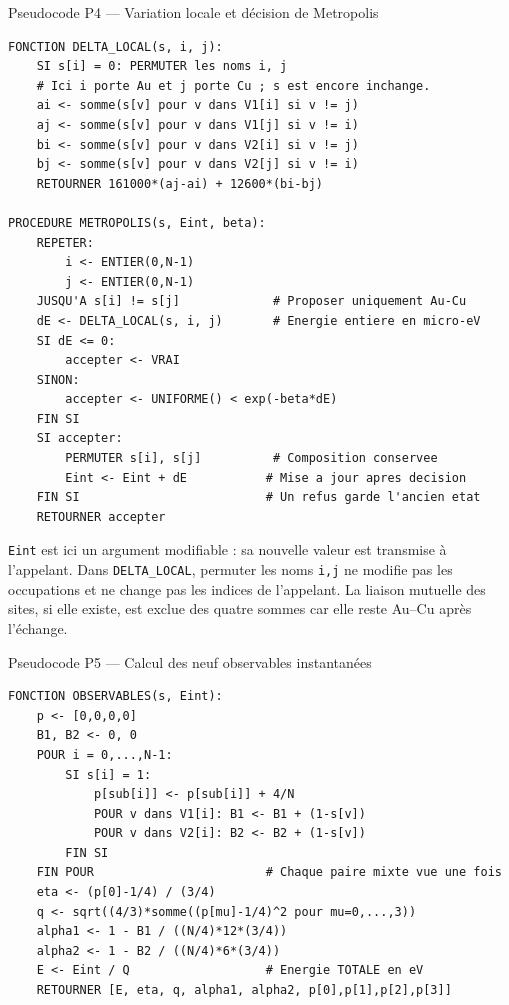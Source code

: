 \documentclass[10pt,a4paper]{article}
\begin{document}
\begin{algocode}{Pseudocode P4 --- Variation locale et décision de Metropolis}
\small
\begin{verbatim}
FONCTION DELTA_LOCAL(s, i, j):
    SI s[i] = 0: PERMUTER les noms i, j
    # Ici i porte Au et j porte Cu ; s est encore inchange.
    ai <- somme(s[v] pour v dans V1[i] si v != j)
    aj <- somme(s[v] pour v dans V1[j] si v != i)
    bi <- somme(s[v] pour v dans V2[i] si v != j)
    bj <- somme(s[v] pour v dans V2[j] si v != i)
    RETOURNER 161000*(aj-ai) + 12600*(bi-bj)

PROCEDURE METROPOLIS(s, Eint, beta):
    REPETER:
        i <- ENTIER(0,N-1)
        j <- ENTIER(0,N-1)
    JUSQU'A s[i] != s[j]             # Proposer uniquement Au-Cu
    dE <- DELTA_LOCAL(s, i, j)       # Energie entiere en micro-eV
    SI dE <= 0:
        accepter <- VRAI
    SINON:
        accepter <- UNIFORME() < exp(-beta*dE)
    FIN SI
    SI accepter:
        PERMUTER s[i], s[j]          # Composition conservee
        Eint <- Eint + dE           # Mise a jour apres decision
    FIN SI                          # Un refus garde l'ancien etat
    RETOURNER accepter
\end{verbatim}
\end{algocode}

\texttt{Eint} est ici un argument modifiable : sa nouvelle valeur est
transmise à l'appelant. Dans \texttt{DELTA\_LOCAL}, permuter les noms
\texttt{i,j} ne modifie pas les occupations et ne change pas les indices
de l'appelant. La liaison mutuelle des sites, si elle existe, est exclue
des quatre sommes car elle reste Au--Cu après l'échange.

\begin{algocode}{Pseudocode P5 --- Calcul des neuf observables instantanées}
\small
\begin{verbatim}
FONCTION OBSERVABLES(s, Eint):
    p <- [0,0,0,0]
    B1, B2 <- 0, 0
    POUR i = 0,...,N-1:
        SI s[i] = 1:
            p[sub[i]] <- p[sub[i]] + 4/N
            POUR v dans V1[i]: B1 <- B1 + (1-s[v])
            POUR v dans V2[i]: B2 <- B2 + (1-s[v])
        FIN SI
    FIN POUR                        # Chaque paire mixte vue une fois
    eta <- (p[0]-1/4) / (3/4)
    q <- sqrt((4/3)*somme((p[mu]-1/4)^2 pour mu=0,...,3))
    alpha1 <- 1 - B1 / ((N/4)*12*(3/4))
    alpha2 <- 1 - B2 / ((N/4)*6*(3/4))
    E <- Eint / Q                   # Energie TOTALE en eV
    RETOURNER [E, eta, q, alpha1, alpha2, p[0],p[1],p[2],p[3]]
\end{verbatim}
\end{algocode}
\end{document}
